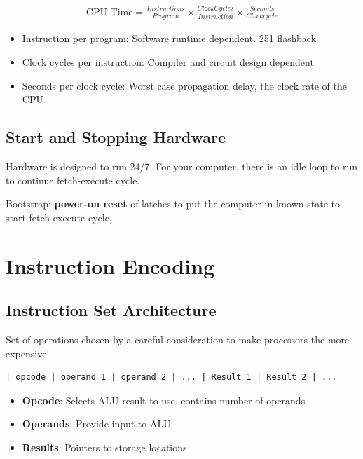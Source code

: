 \documentclass[11pt]{article}
\begin{document}
\begin{align*}
\text{CPU Time} = \frac{Instructions}{Program} \times \frac{Clock Cycles}{Instruction} \times \frac{Seconds}{Clock cycle}
\end{align*}

\begin{itemize}
\item Instruction per program: Software runtime dependent. 251 flashback
\item Clock cycles per instruction: Compiler and circuit design dependent
\item Seconds per clock cycle: Worst case propagation delay, the clock rate of the CPU
\end{itemize}

\subsection{Start and Stopping Hardware}
\label{sec:org12e44db}

Hardware is designed to run 24/7. For your computer, there is an idle loop to run to continue fetch-execute cycle.

Bootstrap: \textbf{power-on reset} of latches to put the computer in known state to start fetch-execute cycle, 

\section{Instruction Encoding}
\label{sec:org908d292}

\subsection{Instruction Set Architecture}
\label{sec:org426133b}

Set of operations chosen by a careful consideration to make processors the more expensive.

\begin{verbatim}
| opcode | operand 1 | operand 2 | ... | Result 1 | Result 2 | ...
\end{verbatim}

\begin{itemize}
\item \textbf{Opcode}: Selects ALU result to use, contains number of operands
\item \textbf{Operands}: Provide input to ALU
\item \textbf{Results}: Pointers to storage locations
\end{itemize}
\end{document}
